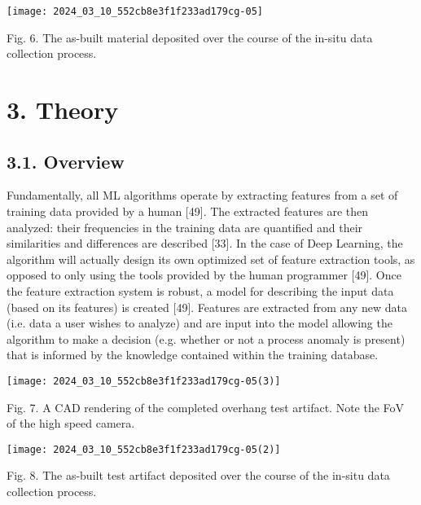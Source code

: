 \documentclass[10pt]{article}
\begin{document}
\begin{center}
\texttt{[image: 2024\_03\_10\_552cb8e3f1f233ad179cg-05]}
\end{center}

Fig. 6. The as-built material deposited over the course of the in-situ data collection process.

\section*{3. Theory}
\subsection*{3.1. Overview}
Fundamentally, all ML algorithms operate by extracting features from a set of training data provided by a human [49]. The extracted features are then analyzed: their frequencies in the training data are quantified and their similarities and differences are described [33]. In the case of Deep Learning, the algorithm will actually design its own optimized set of feature extraction tools, as opposed to only using the tools provided by the human programmer [49]. Once the feature extraction system is robust, a model for describing the input data (based on its features) is created [49]. Features are extracted from any new data (i.e. data a user wishes to analyze) and are input into the model allowing the algorithm to make a decision (e.g. whether or not a process anomaly is present) that is informed by the knowledge contained within the training database.

\begin{center}
\texttt{[image: 2024\_03\_10\_552cb8e3f1f233ad179cg-05(3)]}
\end{center}

Fig. 7. A CAD rendering of the completed overhang test artifact. Note the FoV of the high speed camera.

\begin{center}
\texttt{[image: 2024\_03\_10\_552cb8e3f1f233ad179cg-05(2)]}
\end{center}

Fig. 8. The as-built test artifact deposited over the course of the in-situ data collection process.
\end{document}
